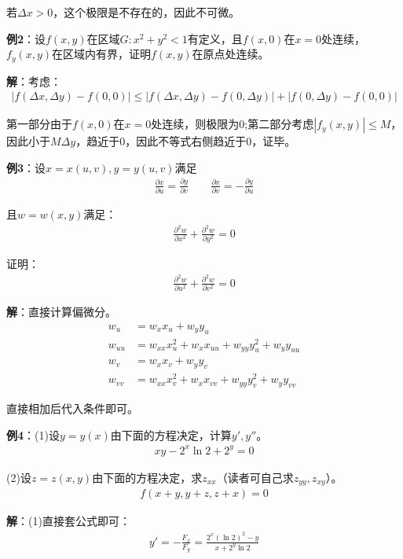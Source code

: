 \documentclass{ctexart}
\let\oldtextbf\textbf %
\renewcommand{\textbf}[1]{\textcolor{btex}{\oldtextbf{#1}}} %
\begin{document}
若$\Delta x>0$，这个极限是不存在的，因此不可微。

\textbf{例2}：设$f(x,y)$在区域$G:x^2+y^2<1$有定义，且$f(x,0)$在$x=0$处连续，$f_y(x,y)$在区域内有界，证明$f(x,y)$在原点处连续。

\textbf{解}：考虑：
\begin{align*}
    |f(\Delta x,\Delta y)-f(0,0)|\leq |f(\Delta x,\Delta y)-f(0,\Delta y)|+|f(0,\Delta y)-f(0,0)|
\end{align*}

第一部分由于$f(x,0)$在$x=0$处连续，则极限为0;第二部分考虑$|f_y(x,y)|\leq M$，因此小于$M\Delta y$，趋近于0，因此不等式右侧趋近于0，证毕。

\textbf{例3}：设$x=x(u,v),y=y(u,v)$满足
\begin{align*}
    \frac{\partial x}{\partial u}=\frac{\partial y}{\partial v}\qquad \frac{\partial x}{\partial v}=-\frac{\partial y}{\partial u}
\end{align*}


且$w=w(x,y)$满足：
\begin{align*}
    \frac{\partial ^2 w}{\partial x^2}+    \frac{\partial ^2 w}{\partial y^2}=0
\end{align*}

证明：
\begin{align*}
    \frac{\partial ^2 w}{\partial u^2}+    \frac{\partial ^2 w}{\partial v^2}=0
\end{align*}

\textbf{解}：直接计算偏微分。
\begin{align*}
w_u&=w_xx_u+w_yy_u\\
w_{uu}&=w_{xx}x_u^2+w_xx_{uu}+w_{yy}y_u^2+w_yy_{uu}\\
w_v&=w_xx_v+w_yy_v\\
w_{vv}&=w_{xx}x_v^2+w_xx_{vv}+w_{yy}y_v^2+w_yy_{vv}
\end{align*}

直接相加后代入条件即可。

\textbf{例4}：(1)设$y=y(x)$由下面的方程决定，计算$y',y''$。
\begin{align*}
    xy-2^x\ln 2+2^y=0
\end{align*}

(2)设$z=z(x,y)$由下面的方程决定，求$z_{xx}$（读者可自己求$z_{yy},z_{xy}$）。
\begin{align*}
    f(x+y,y+z,z+x)=0
\end{align*}

\textbf{解}：(1)直接套公式即可：
\begin{align*}
    y'=-\frac{F_x}{F_y}=\frac{2^x(\ln 2)^2-y}{x+2^y\ln 2}
\end{align*}
\end{document}
